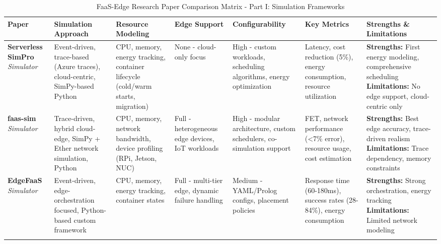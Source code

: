 \begin{landscape}
\begin{table}[htbp]
\centering
\caption{FaaS-Edge Research Paper Comparison Matrix - Part I: Simulation Frameworks}
\label{tab:faas-simulators-matrix}
\scriptsize
\begin{tabular}{|p{2.2cm}|p{3.8cm}|p{3.8cm}|p{2.5cm}|p{2.8cm}|p{3.2cm}|p{4.5cm}|}
\hline
\textbf{Paper} & \textbf{Simulation Approach} & \textbf{Resource Modeling} & \textbf{Edge Support} & \textbf{Configurability} & \textbf{Key Metrics} & \textbf{Strengths \& Limitations} \\
\hline

\textbf{Serverless SimPro} \cite{das2022serverlesssimpro} \newline \textit{Simulator} &
Event-driven, trace-based (Azure traces), cloud-centric, SimPy-based Python &
CPU, memory, energy tracking, container lifecycle (cold/warm starts, migration) &
None - cloud-only focus &
High - custom workloads, scheduling algorithms, energy optimization &
Latency, cost reduction (5\%), energy consumption, resource utilization &
\textbf{Strengths:} First energy modeling, comprehensive scheduling \newline \textbf{Limitations:} No edge support, cloud-centric only \\
\hline

\rowcolor[RGB]{209,209,209}
\textbf{faas-sim} \cite{boughzala2022faassim} \newline \textit{Simulator} &
Trace-driven, hybrid cloud-edge, SimPy + Ether network simulation, Python &
CPU, memory, network bandwidth, device profiling (RPi, Jetson, NUC) &
Full - heterogeneous edge devices, IoT workloads &
High - modular architecture, custom schedulers, co-simulation support &
FET, network performance (<7\% error), resource usage, cost estimation &
\textbf{Strengths:} Best edge accuracy, trace-driven realism \newline \textbf{Limitations:} Trace dependency, memory constraints \\
\arrayrulecolor{black}\hline\arrayrulecolor{black}

\rowcolor[RGB]{209,209,209}
\textbf{EdgeFaaS} \cite{li2022edgefaas} \newline \textit{Simulator} &
Event-driven, edge-orchestration focused, Python-based custom framework &
CPU, memory, energy tracking, container states  &
Full - multi-tier edge, dynamic failure handling &
Medium - YAML/Prolog configs, placement policies &
Response time (60-180ms), success rates (28-84\%), energy consumption &
\textbf{Strengths:} Strong orchestration, energy tracking \newline \textbf{Limitations:} Limited network modeling \\
\arrayrulecolor{black}\hline\arrayrulecolor{black}


\end{tabular}
\end{table}
\end{landscape}
